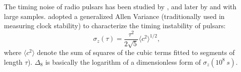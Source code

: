The timing noise of radio pulsars has been studied by
\citet{ch80,cd85,antt94,dmhd95, mtem97}, and later by \citet{hlk10} and
\citet{sc10} with large samples. 
\citet{mtem97} adopted a generalized Allen Variance (traditionally used in
measuring clock stability) to characterize the timing instability of pulsars:
\begin{equation}
\label{eq:sigmaz}
\sigma_z(\tau) = \frac{\tau^2}{2\sqrt{5}}\langle c^2 \rangle^{1/2},
\end{equation}
where $\langle c^2\rangle$ denote the sum of squares of the cubic
terms fitted to segments of length $\tau$). 
$\Delta_8$ is basically the logarithm of a dimensionless form of $\sigma_z(10^8~s)$.
